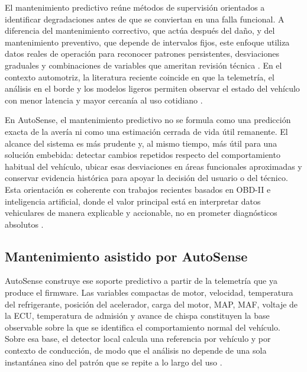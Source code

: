 \documentclass[12pt,letterpaper]{report}
\begin{document}
\label{sec:mantenimiento-predictivo}

El mantenimiento predictivo reúne métodos de supervisión orientados a identificar degradaciones antes de que se conviertan en una falla funcional. A diferencia del mantenimiento correctivo, que actúa después del daño, y del mantenimiento preventivo, que depende de intervalos fijos, este enfoque utiliza datos reales de operación para reconocer patrones persistentes, desviaciones graduales y combinaciones de variables que ameritan revisión técnica \cite{mahale2025_review_predictive_maintenance,shafi2018_vehicle_remote_health}. En el contexto automotriz, la literatura reciente coincide en que la telemetría, el análisis en el borde y los modelos ligeros permiten observar el estado del vehículo con menor latencia y mayor cercanía al uso cotidiano \cite{selvaraj2023_advanced_telematics,kalalas2025_ai_driven_monitoring}.

En AutoSense, el mantenimiento predictivo no se formula como una predicción exacta de la avería ni como una estimación cerrada de vida útil remanente. El alcance del sistema es más prudente y, al mismo tiempo, más útil para una solución embebida: detectar cambios repetidos respecto del comportamiento habitual del vehículo, ubicar esas desviaciones en áreas funcionales aproximadas y conservar evidencia histórica para apoyar la decisión del usuario o del técnico. Esta orientación es coherente con trabajos recientes basados en OBD-II e inteligencia artificial, donde el valor principal está en interpretar datos vehiculares de manera explicable y accionable, no en prometer diagnósticos absolutos \cite{michailidis2025_obdii_review,tormos2025_explainable_ai}.

\subsection{Mantenimiento asistido por AutoSense}

AutoSense construye ese soporte predictivo a partir de la telemetría que ya produce el firmware. Las variables compactas de motor, velocidad, temperatura del refrigerante, posición del acelerador, carga del motor, MAP, MAF, voltaje de la ECU, temperatura de admisión y avance de chispa constituyen la base observable sobre la que se identifica el comportamiento normal del vehículo. Sobre esa base, el detector local calcula una referencia por vehículo y por contexto de conducción, de modo que el análisis no depende de una sola instantánea sino del patrón que se repite a lo largo del uso \cite{singh2021_obdii_iot,dabarera2022_iot_vehicle_management}.
\end{document}
